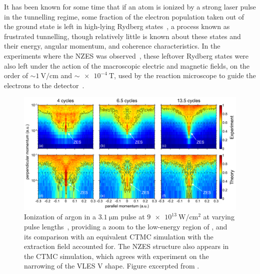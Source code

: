 It has been known for some time that if an atom is ionized by a strong laser pulse in the tunnelling regime, some fraction of the electron population taken out of the ground state is left in high-lying Rydberg states~\cite{ nubbemeyer_rydberg-creation_2008, landsman_Rydberg-creation_2015, larimian_rydberg-detection_conference_2015}, a process known as frustrated tunnelling, though relatively little is known about these states and their energy, angular momentum, and coherence characteristics. In the experiments where the NZES was observed~\cite{dura_ionization_2013, ZES_paper}, these leftover Rydberg states were also left under the action of the macroscopic electric and magnetic fields, on the order of ${\sim}\SI{1}{\volt/\centi\meter}$ and ${\sim}\SI{e-4}{\tesla}$, used by the reaction microscope to guide the electrons to the detector~\cite{moshammer_ReMi_2003}.





\begin{figure}[t]
  \centering
  \includegraphics[width=\textwidth]{6-LES/Figures/figure6Q.png}
  \caption[
  Photoelectron momentum maps from measurements and CTMC simulations, showing a narrowing of the VLES V shape for longer pulses, together with a NZES-like structure, as observed by B. Wolter et al.
  ]{
  Ionization of argon in a $\SI{3.1}{\micro\meter}$ pulse at $\SI{9e13}{\watt/\centi\meter^2}$ at varying pulse lengths~\cite{ZES_paper}, providing a zoom to the low-energy region of , and its comparison with an equivalent CTMC simulation with the extraction field accounted for. The NZES structure also appears in the CTMC simulation, which agrees with experiment on the narrowing of the VLES V shape.
  Figure excerpted from .
  }
\label{f6-wolter-nzes-original-figure}
\end{figure}



